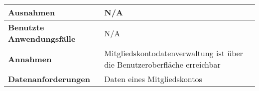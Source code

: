 \begin{table} [H]
\begin{tabularx}{\textwidth}{|l|X|}
        \hline
        \textbf{Ausnahmen}                & N/A                                                                                                                                       \\
        \hline
        \textbf{Benutzte Anwendungsfälle} & N/A                                                                                                                                       \\
        \hline
        \textbf{Annahmen}                 & Mitgliedskontodatenverwaltung ist über die Benutzeroberfläche erreichbar                                                                  \\
        \hline
        \textbf{Datenanforderungen}       & Daten eines Mitgliedskontos                                                                                                               \\
        \bottomrule
    \end{tabularx}
\end{table}
